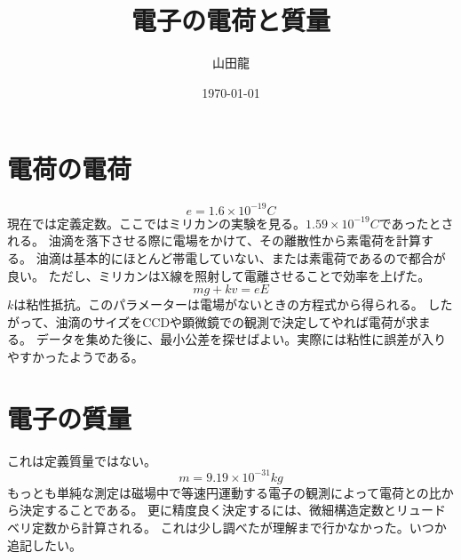 \documentclass{jsarticle}
\date{\today}
\author{山田龍}
\title{電子の電荷と質量}
\newcommand{\beq}{\begin{equation}}
\newcommand{\eeq}{\end{equation}}
\begin{document}
\maketitle
\section{電荷の電荷}
\beq
    e = 1.6 \times 10^{-19} C
\eeq
現在では定義定数。ここではミリカンの実験を見る。$1.59\times 10^{-19}C$であったとされる。
油滴を落下させる際に電場をかけて、その離散性から素電荷を計算する。
油滴は基本的にほとんど帯電していない、または素電荷であるので都合が良い。
ただし、ミリカンはX線を照射して電離させることで効率を上げた。
\beq
 mg + kv = eE
\eeq
$k$は粘性抵抗。このパラメーターは電場がないときの方程式から得られる。
したがって、油滴のサイズをCCDや顕微鏡での観測で決定してやれば電荷が求まる。
データを集めた後に、最小公差を探せばよい。実際には粘性に誤差が入りやすかったようである。
\section{電子の質量}
これは定義質量ではない。
\beq
    m = 9.19 \times 10^{-31} kg
\eeq
もっとも単純な測定は磁場中で等速円運動する電子の観測によって電荷との比から決定することである。
更に精度良く決定するには、微細構造定数とリュードベリ定数から計算される。
これは少し調べたが理解まで行かなかった。いつか追記したい。
\end{document}
